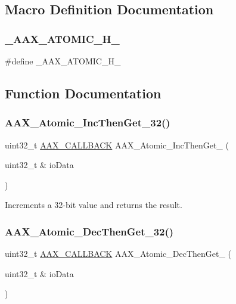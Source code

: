 \subsection{Macro Definition Documentation}
\mbox{\label{a00398_a95d8ffad4ab4b65ff2d28aa76e167daf}} 
\subsubsection{\texorpdfstring{\_AAX\_ATOMIC\_H\_}{\_AAX\_ATOMIC\_H\_}}
{\footnotesize\ttfamily \#define \+\_\+\+A\+A\+X\+\_\+\+A\+T\+O\+M\+I\+C\+\_\+\+H\+\_\+}



\subsection{Function Documentation}
\mbox{\label{a00398_a56633d7039fae1d31c8984f9baafa17e}} 
\subsubsection{\texorpdfstring{AAX\_Atomic\_IncThenGet\_32()}{AAX\_Atomic\_IncThenGet\_32()}}
{\footnotesize\ttfamily uint32\+\_\+t \mbox{\hyperlink{a00392_aaa22112139aa627574b1ef562f579d43}{A\+A\+X\+\_\+\+C\+A\+L\+L\+B\+A\+CK}} A\+A\+X\+\_\+\+Atomic\+\_\+\+Inc\+Then\+Get\+\_ (\begin{DoxyParamCaption}\item[{uint32\+\_\+t \&}]{io\+Data }\end{DoxyParamCaption})}



Increments a 32-\/bit value and returns the result. 

\mbox{\label{a00398_adb8e12a71f90de1328a4fde6dd22fc41}} 
\subsubsection{\texorpdfstring{AAX\_Atomic\_DecThenGet\_32()}{AAX\_Atomic\_DecThenGet\_32()}}
{\footnotesize\ttfamily uint32\+\_\+t \mbox{\hyperlink{a00392_aaa22112139aa627574b1ef562f579d43}{A\+A\+X\+\_\+\+C\+A\+L\+L\+B\+A\+CK}} A\+A\+X\+\_\+\+Atomic\+\_\+\+Dec\+Then\+Get\+\_ (\begin{DoxyParamCaption}\item[{uint32\+\_\+t \&}]{io\+Data }\end{DoxyParamCaption})}



